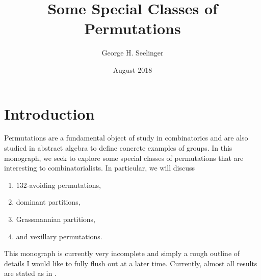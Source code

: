 \documentclass[11pt,leqno,oneside]{amsart}
\title[Special Classes of Permutations]{Some Special Classes of Permutations}
\author{George H. Seelinger}
\date{August 2018}
\numberwithin{thm}{section}
\begin{document}
\maketitle
\section{Introduction}
Permutations are a fundamental object of study in combinatorics and
are also studied in abstract algebra to define concrete examples of
groups. In this monograph, we seek to explore some special classes of
permutations that are interesting to combinatorialists. In particular,
we will discuss
\begin{enumerate}
\item \(132\)-avoiding permutations,
\item dominant partitions,
\item Grassmannian partitions,
\item and vexillary permutations.
\end{enumerate}
This monograph is currently very incomplete and simply a rough outline
of details I would like to fully flush out at a later time. Currently,
almost all results are stated as in \cite{manivel}.
\end{document}

